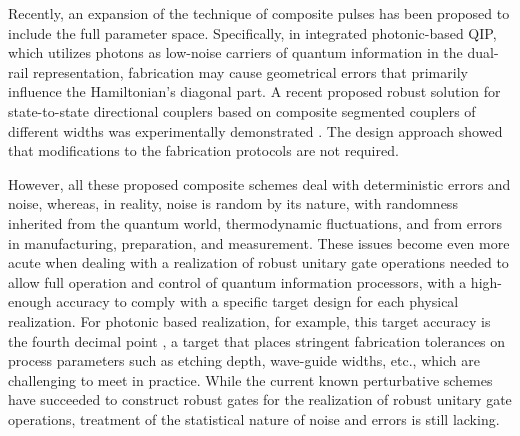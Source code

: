 \documentclass[floatfix,reprint, amsmath,amssymb,aps,superscriptaddress,nofootinbib]{revtex4-2}
\begin{document}
Recently, an expansion of the technique of composite pulses has been proposed to include the full parameter space. Specifically, in integrated photonic-based QIP, which utilizes photons as low-noise carriers of quantum information in the dual-rail representation, fabrication may cause geometrical errors that primarily influence the Hamiltonian's diagonal part. A recent proposed robust solution for state-to-state directional couplers based on composite segmented couplers of different widths \cite{Kyoseva2019} was experimentally demonstrated \cite{9774914}. The design approach showed that modifications to the fabrication protocols are not required.

However, all these proposed composite schemes deal with deterministic errors and noise, whereas, in reality, noise is random by its nature, with randomness inherited from the quantum world, thermodynamic fluctuations, and from errors in manufacturing, preparation, and measurement. These issues become even more acute when dealing with a realization of robust unitary gate operations needed to allow full operation and control of quantum information processors, with a high-enough accuracy to comply with a specific target design for each physical realization. For photonic based realization, for example, this target accuracy is the fourth decimal point \cite{Matthews2009,OIDA:,Pelucchi2022,Moody_2022}, a target that places stringent fabrication tolerances on process parameters such as etching depth, wave-guide widths, etc., which are challenging to meet in practice. While the current known perturbative schemes have succeeded to construct robust gates for the realization of robust unitary gate operations, treatment of the statistical nature of noise and errors is still lacking.
\end{document}
